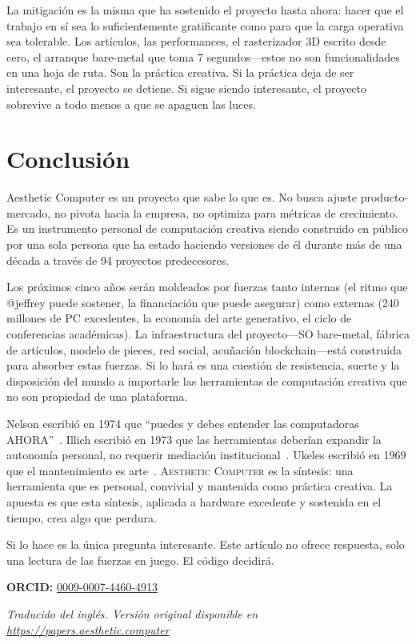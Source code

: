 \documentclass[10pt,letterpaper,twocolumn]{article}
\newcommand{\ac}{\textsc{Aesthetic Computer}}
\begin{document}
La mitigación es la misma que ha sostenido el proyecto hasta ahora: hacer que el trabajo en sí sea lo suficientemente gratificante como para que la carga operativa sea tolerable. Los artículos, las performances, el rasterizador 3D escrito desde cero, el arranque bare-metal que toma 7 segundos---estos no son funcionalidades en una hoja de ruta. Son la práctica creativa. Si la práctica deja de ser interesante, el proyecto se detiene. Si sigue siendo interesante, el proyecto sobrevive a todo menos a que se apaguen las luces.


\section{Conclusión}

Aesthetic Computer es un proyecto que sabe lo que es. No busca ajuste producto-mercado, no pivota hacia la empresa, no optimiza para métricas de crecimiento. Es un instrumento personal de computación creativa siendo construido en público por una sola persona que ha estado haciendo versiones de él durante más de una década a través de 94 proyectos predecesores.

Los próximos cinco años serán moldeados por fuerzas tanto internas (el ritmo que @jeffrey puede sostener, la financiación que puede asegurar) como externas (240 millones de PC excedentes, la economía del arte generativo, el ciclo de conferencias académicas). La infraestructura del proyecto---SO bare-metal, fábrica de artículos, modelo de pieces, red social, acuñación blockchain---está construida para absorber estas fuerzas. Si lo hará es una cuestión de resistencia, suerte y la disposición del mundo a importarle las herramientas de computación creativa que no son propiedad de una plataforma.

Nelson escribió en 1974 que ``puedes y debes entender las computadoras AHORA''~\citep{nelson1974computerlib}. Illich escribió en 1973 que las herramientas deberían expandir la autonomía personal, no requerir mediación institucional~\citep{illich1973tools}. Ukeles escribió en 1969 que el mantenimiento es arte~\citep{ukeles1969manifesto}. \ac{} es la síntesis: una herramienta que es personal, convivial y mantenida como práctica creativa. La apuesta es que esta síntesis, aplicada a hardware excedente y sostenida en el tiempo, crea algo que perdura.

Si lo hace es la única pregunta interesante. Este artículo no ofrece respuesta, solo una lectura de las fuerzas en juego. El código decidirá.

\vspace{0.5em}
\noindent\textbf{ORCID:} \href{https://orcid.org/0009-0007-4460-4913}{0009-0007-4460-4913}

\vspace{0.5em}\noindent\textit{Traducido del inglés. Versión original disponible en \url{https://papers.aesthetic.computer}}




\end{document}
